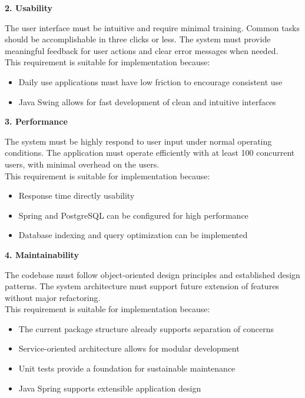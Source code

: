 \documentclass[a4paper,10pt]{article}
\begin{document}
        \textbf{2. Usability}

        The user interface must be intuitive and require minimal training. Common tasks should be accomplishable in three clicks or less. The system must provide meaningful feedback for user actions and clear error messages when needed.  \\

        This requirement is suitable for implementation because:
        \begin{itemize}
            \item Daily use applications must have low friction to encourage consistent use
            \item Java Swing allows for fast development of clean and intuitive interfaces
        \end{itemize}

        \textbf{3. Performance}

        The system must be highly respond to user input under normal operating conditions. The application must operate efficiently with at least 100 concurrent users, with minimal overhead on the users. \\

        This requirement is suitable for implementation because:
        \begin{itemize}
            \item Response time directly usability
            \item Spring and PostgreSQL can be configured for high performance
            \item Database indexing and query optimization can be implemented
        \end{itemize}

        \textbf{4. Maintainability}

        The codebase must follow object-oriented design principles and established design patterns. The system architecture must support future extension of features without major refactoring. \\

        This requirement is suitable for implementation because:
        \begin{itemize}
            \item The current package structure already supports separation of concerns
            \item Service-oriented architecture allows for modular development
            \item Unit tests provide a foundation for sustainable maintenance
            \item Java Spring supports extensible application design
        \end{itemize}
\end{document}
